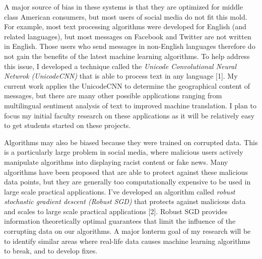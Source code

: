 \documentclass[12pt]{article}
\newcommand{\fixme}[1]{\textcolor{red}{#1}}
\begin{document}
A major source of bias in these systems is that they are optimized for middle class American consumers,
but most users of social media do not fit this mold.
For example, most text processing algorithms were developed for English (and related languages),
but most messages on Facebook and Twitter are not written in English.
Those users who send messages in non-English languages therefore do not gain the benefits of the latest machine learning algorithms.
To help address this issue,
I developed a technique called the \emph{Unicode Convolutional Neural Netwrok (UnicodeCNN)} that is able to process text in any language [1].
My current work applies the UnicodeCNN to determine the geographical content of messages,
but there are many other possible applications ranging from multilingual sentiment analysis of text to improved machine translation.
I plan to focus my initial faculty research on these applications as it will be relatively easy to get students started on these projects.

Algorithms may also be biased because they were trained on corrupted data.
This is a particularly large problem in social media,
where malicious users actively manipulate algorithms into displaying racist content or fake news.
Many algorithms have been proposed that are able to protect against these malicious data points,
but they are generally too computationally expensive to be used in large scale practical applications.
I've developed an algorithm called \emph{robust stochastic gradient descent (Robust SGD)} that protects against malicious data and scales to large scale practical applications [2].
Robust SGD provides information theoretically optimal guarantees that limit the influence of the corrupting data on our algorithms.
A major lonterm goal of my research will be to identify similar areas where real-life data causes machine learning algorithms to break,
and to develop fixes.

\end{document}
